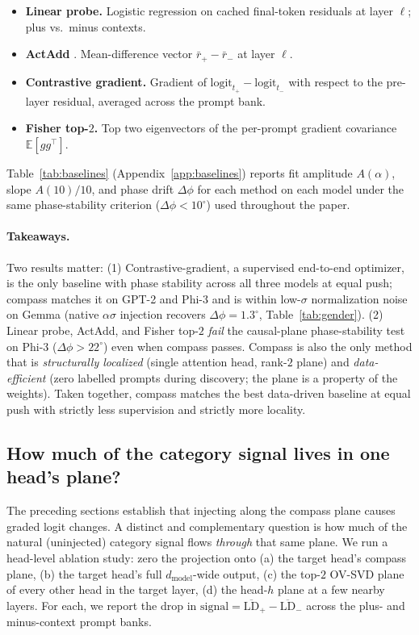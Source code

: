 \begin{itemize}
    \item \textbf{Linear probe.} Logistic regression on cached final-token
    residuals at layer $\ell$; plus vs.\ minus contexts.
    \item \textbf{ActAdd} \citep{turner2023actadd}. Mean-difference vector
    $\bar{r}_{+} - \bar{r}_{-}$ at layer $\ell$.
    \item \textbf{Contrastive gradient.} Gradient of
    $\text{logit}_{t_{+}} - \text{logit}_{t_{-}}$ with respect to the
    pre-layer residual, averaged across the prompt bank.
    \item \textbf{Fisher top-$2$.} Top two eigenvectors of the
    per-prompt gradient covariance $\mathbb{E}[g g^{\top}]$.
\end{itemize}

Table~\ref{tab:baselines} (Appendix~\ref{app:baselines}) reports fit
amplitude $A(\alpha)$, slope $A(10)/10$, and phase drift $\Delta\phi$
for each method on each model under the same phase-stability criterion
($\Delta\phi < 10^\circ$) used throughout the paper.

\paragraph{Takeaways.} Two results matter: (1) Contrastive-gradient, a
supervised end-to-end optimizer, is the only baseline with phase
stability across all three models at equal push; compass matches it on
GPT-2 and Phi-3 and is within low-$\sigma$ normalization noise on Gemma
(native $\alpha\sigma$ injection recovers $\Delta\phi=1.3^\circ$,
Table~\ref{tab:gender}). (2) Linear probe, ActAdd, and Fisher top-$2$
\emph{fail} the causal-plane phase-stability test on Phi-3
($\Delta\phi > 22^\circ$) even when compass passes. Compass is also the
only method that is \emph{structurally localized} (single attention
head, rank-$2$ plane) and \emph{data-efficient} (zero labelled prompts
during discovery; the plane is a property of the weights). Taken
together, compass matches the best data-driven baseline at equal push
with strictly less supervision and strictly more locality.

\subsection{How much of the category signal lives in one head's plane?}
\label{sec:headshare}

The preceding sections establish that injecting along the compass plane
causes graded logit changes. A distinct and complementary question is
how much of the natural (uninjected) category signal flows \emph{through}
that same plane. We run a head-level ablation study: zero the projection
onto (a) the target head's compass plane, (b) the target head's full
$d_\text{model}$-wide output, (c) the top-$2$ OV-SVD plane of every
other head in the target layer, (d) the head-$h$ plane at a few nearby
layers. For each, we report the drop in
$\mathrm{signal} = \overline{\mathrm{LD}}_{+} - \overline{\mathrm{LD}}_{-}$
across the plus- and minus-context prompt banks.

